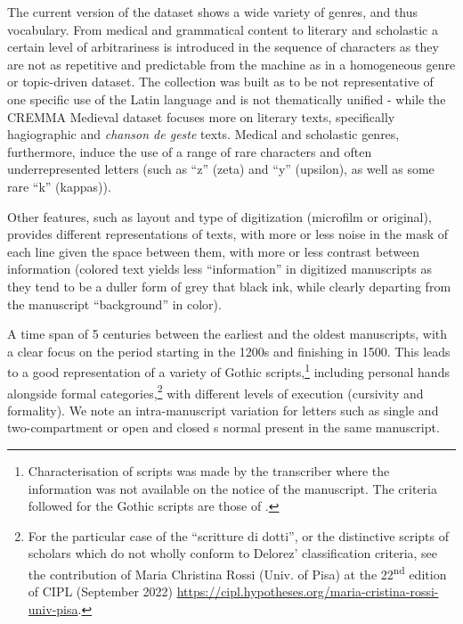 \documentclass{article}
\begin{document}
The current version of the dataset shows a wide variety of genres, and thus vocabulary. From medical and grammatical content to literary and scholastic a certain level of arbitrariness is introduced in the sequence of characters as they are not as repetitive and predictable from the machine as in a homogeneous genre or topic-driven dataset. The collection was built as to be not representative of one specific use of the Latin language and is not thematically unified - while the CREMMA Medieval dataset focuses more on literary texts, specifically hagiographic and \textit{chanson de geste} texts. %
Medical and scholastic genres, furthermore, induce the use of a range of rare characters and often underrepresented letters (such as \enquote{z} (zeta) and \enquote{y} (upsilon), as well as some rare \enquote{k} (kappas)).

Other features, such as layout and type of digitization (microfilm or original), provides different representations of texts, with more or less noise in the mask of each line given the space between them, with more or less contrast between information (colored text yields less \enquote{information} in digitized manuscripts as they tend to be a duller form of grey that black ink, while clearly departing from the manuscript \enquote{background} in color).

A time span of 5 centuries between the earliest and the oldest manuscripts, with a clear focus on the period starting in the 1200s and finishing in 1500. This leads to a good representation of a variety of Gothic scripts,\footnote{Characterisation of scripts was made by the transcriber where the information was not available on the notice of the manuscript. The criteria followed for the Gothic scripts are those of \cite{derolez2003palaeography}. %
} including personal hands alongside formal categories,\footnote{For the particular case of the \enquote{scritture di dotti}, or the distinctive scripts of scholars which do not wholly conform to Delorez' classification criteria, see the contribution of Maria Christina Rossi (Univ. of Pisa) at the 22\textsuperscript{nd} edition of CIPL (September 2022) \url{https://cipl.hypotheses.org/maria-cristina-rossi-univ-pisa}.} with different levels of execution (cursivity and formality). We note an intra-manuscript variation for letters such as single and two-compartment or open and closed s normal present in the same manuscript.
\end{document}
